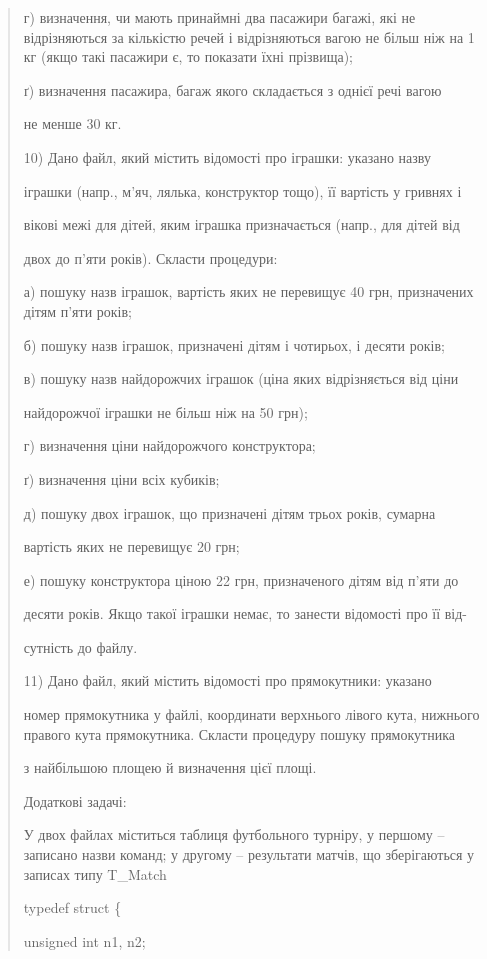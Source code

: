 \documentclass[]{article}
\begin{document}
\begin{quote}
г) визначення, чи мають принаймні два пасажири багажі, які не
відрізняються за кількістю речей і відрізняються вагою не більш ніж на 1
кг (якщо такі пасажири є, то показати їхні прізвища);

ґ) визначення пасажира, багаж якого складається з однієї речі вагою

не менше 30 кг.

10) Дано файл, який містить відомості про іграшки: указано назву

іграшки (напр., м'яч, лялька, конструктор тощо), її вартість у гривнях і

вікові межі для дітей, яким іграшка призначається (напр., для дітей від

двох до п'яти років). Скласти процедури:

а) пошуку назв іграшок, вартість яких не перевищує 40 грн, призначених
дітям п'яти років;

б) пошуку назв іграшок, призначені дітям і чотирьох, і десяти років;

в) пошуку назв найдорожчих іграшок (ціна яких відрізняється від ціни

найдорожчої іграшки не більш ніж на 50 грн);

г) визначення ціни найдорожчого конструктора;

ґ) визначення ціни всіх кубиків;

д) пошуку двох іграшок, що призначені дітям трьох років, сумарна

вартість яких не перевищує 20 грн;

е) пошуку конструктора ціною 22 грн, призначеного дітям від п'яти до

десяти років. Якщо такої іграшки немає, то занести відомості про її від-

сутність до файлу.

11) Дано файл, який містить відомості про прямокутники: указано

номер прямокутника у файлі, координати верхнього лівого кута, нижнього
правого кута прямокутника. Скласти процедуру пошуку прямокутника

з найбільшою площею й визначення цієї площі.

Додаткові задачі:

У двох файлах міститься таблиця футбольного турніру, у першому --
записано назви команд; у другому -- результати матчів, що зберігаються у
записах типу T\_Match

typedef struct \{

unsigned int n1, n2;


\end{quote}
\end{document}
